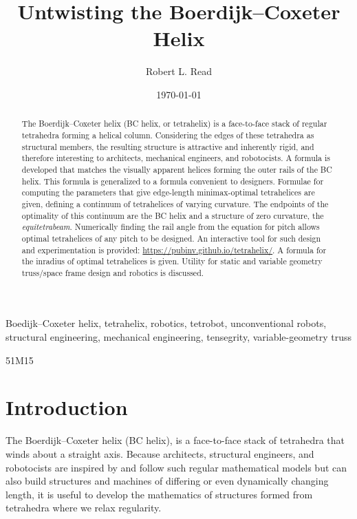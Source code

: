 \documentclass[review]{siamonline1116}
\title{Untwisting the Boerdijk--Coxeter Helix}
\author{Robert L. Read \email{read.robert@gmail.com}
}
\date{\today}
\begin{document}
\maketitle


\begin{abstract}
  The Boerdijk--Coxeter helix (BC helix, or tetrahelix) is a
  face-to-face stack of regular tetrahedra forming a helical column.  Considering the edges of
  these tetrahedra as structural members, the resulting structure is attractive and
  inherently rigid, and therefore interesting to architects,
  mechanical engineers, and robotocists.  A formula is developed that matches the
  visually apparent helices forming the outer rails of the BC helix.
  This formula is generalized to a formula convenient to designers.
  Formulae for 
  computing the
  parameters that give edge-length minimax-optimal tetrahelices
  are given, defining a continuum of tetrahelices of varying curvature.
  The endpoints of the optimality of this continuum are the BC helix and
  a structure of zero curvature, the \emph{equitetrabeam}.
  Numerically finding the rail angle from the equation for
  pitch allows optimal tetrahelices of any pitch to be designed. 
  An interactive tool for such design and experimentation is provided: \url{https://pubinv.github.io/tetrahelix/}.
  A formula for the inradius of optimal tetrahelices is given.
  Utility for static and variable geometry
  truss/space frame design and robotics is discussed.
\end{abstract}

\begin{keywords}
  Boedijk--Coxeter helix, tetrahelix, robotics, tetrobot, unconventional robots,
  structural engineering, mechanical engineering, tensegrity, variable-geometry truss
\end{keywords}
\begin{AMS}
  51M15
\end{AMS}

\section{Introduction}

The Boerdijk--Coxeter helix\cite{coxeter1985simplicial} (BC helix), is
a face-to-face stack of tetrahedra that winds about a straight axis.
Because architects, structural engineers, and robotocists are inspired
by and follow such regular mathematical models but can also build structures and
machines of differing or even dynamically changing length, it is
useful to develop the mathematics of structures formed from tetrahedra
where we relax regularity.
\end{document}
